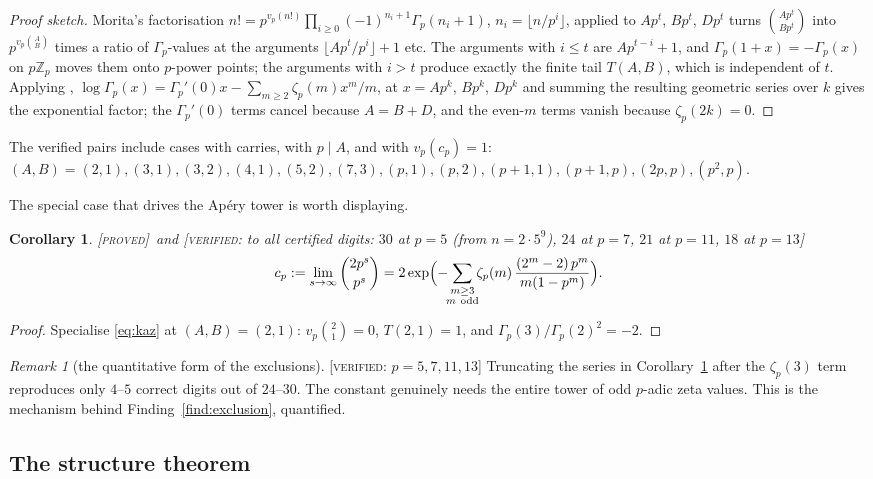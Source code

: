 \documentclass[11pt,reqno]{article}
\newcommand{\ZZ}{\mathbb{Z}}
\newcommand{\Gp}{\Gamma_p}
\newcommand{\vp}{v_p}
\newcommand{\bin}[2]{\binom{#1}{#2}}
\newcommand{\floor}[1]{\lfloor #1 \rfloor}
\newcommand{\PROVED}{{\normalfont\textsc{[proved]}}}
\newcommand{\VER}[1]{{\normalfont\textsc{[verified:} #1\textsc{]}}}
\theoremstyle{plain}
\newtheorem{corollary}[theorem]{Corollary}
\theoremstyle{definition}
\theoremstyle{remark}
\newtheorem{remark}[theorem]{Remark}
\numberwithin{equation}{section}
\begin{document}
\begin{proof}[Proof sketch]
Morita's factorisation \cite{Morita1975}
$n!=p^{\vp(n!)}\prod_{i\ge0}(-1)^{n_i+1}\Gp(n_i+1)$, $n_i=\floor{n/p^i}$,
applied to $A p^t$, $Bp^t$, $Dp^t$ turns $\bin{Ap^t}{Bp^t}$ into
$p^{\vp\binom{A}{B}}$ times a ratio of $\Gp$-values at the arguments
$\floor{Ap^t/p^i}+1$ etc.  The arguments with $i\le t$ are
$Ap^{t-i}+1$, and $\Gp(1+x)=-\Gp(x)$ on $p\ZZ_p$ moves them onto $p$-power
points; the arguments with $i>t$ produce exactly the finite tail $T(A,B)$,
which is independent of $t$.  Applying \cite[eq.~(2)]{BV2025},
$\log\Gp(x)=\Gp'(0)x-\sum_{m\ge2}\zeta_p(m)x^m/m$, at $x=Ap^{k}$, $Bp^{k}$,
$Dp^{k}$ and summing the resulting geometric series over $k$ gives the
exponential factor; the $\Gp'(0)$ terms cancel because $A=B+D$, and the
even-$m$ terms vanish because $\zeta_p(2k)=0$.
\end{proof}

The verified pairs include cases with carries, with $p\mid A$, and with
$\vp(c_p)=1$:
$(A,B)=(2,1),(3,1),(3,2),(4,1),(5,2),(7,3),(p,1),(p,2),(p+1,1),(p+1,p),(2p,p),(p^2,p)$.

The special case that drives the Ap\'ery tower is worth displaying.

\begin{corollary}\label{cor:cp21}
\PROVED\ and \VER{to \emph{all} certified digits: $30$ at $p=5$ (from
$n=2\cdot5^9$), $24$ at $p=7$, $21$ at $p=11$, $18$ at $p=13$}
\[
  c_p:=\lim_{s\to\infty}\bin{2p^s}{p^s}
  =2\exp\Bigl(-\!\!\sum_{\substack{m\ge3\\ m\ \mathrm{odd}}}\!\!
    \zeta_p(m)\,\frac{(2^m-2)\,p^m}{m(1-p^m)}\Bigr).
\]
\end{corollary}
\begin{proof}
Specialise \eqref{eq:kaz} at $(A,B)=(2,1)$: $\vp\binom21=0$, $T(2,1)=1$, and
$\Gp(3)/\Gp(2)^2=-2$.
\end{proof}

\begin{remark}[the quantitative form of the exclusions]\label{rem:trunc}
\VER{$p=5,7,11,13$} Truncating the series in Corollary~\ref{cor:cp21} after the
$\zeta_p(3)$ term reproduces only $4$--$5$ correct digits out of $24$--$30$.
The constant genuinely needs the entire tower of odd $p$-adic zeta values.
This is the mechanism behind Finding~\ref{find:exclusion}, quantified.
\end{remark}

\subsection{The structure theorem}\label{ss:structure}
\end{document}
